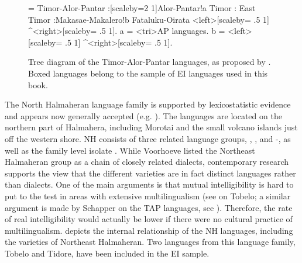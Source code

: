 \begin{figure}

\begin{footnotesize}
\jtree[xunit=5em,yunit=2em]
\! = {Timor-Alor-Pantar}
:[scaleby=2 1]{Alor-Pantar}!a {Timor}
:{} {East Timor}
:{Makasae-Makalero}!b {Fataluku-Oirata}
<left>[scaleby= .5 1]{} ^<right>[scaleby= .5 1]{}.
\!a = <tri>{AP languages}{}.
\!b = <left>[scaleby= .5 1]{} ^<right>[scaleby= .5 1]{}.
\endjtree
\end{footnotesize}

\caption[The Timor-Alor-Pantar languages]{Tree diagram of the Timor-Alor-Pantar languages, as proposed by \citet{schapper2014intro}. Boxed languages belong to the sample of EI languages used in this book.}\label{fig:timor-alor-pantar}
\end{figure}

The North Halmaheran language family is supported by lexicostatistic evidence and appears now generally accepted (e.g. \citealt{Voorhoeve1994, reesink2005west}). The languages are located on the northern part of Halmahera, including Morotai and the small volcano islands just off the western shore. NH consists of three related language groups, , , and -, as well as the family level isolate  \citep{Voorhoeve1994}. While Voor\-hoeve listed the Northeast Halmaheran group as a chain of closely related dialects, contemporary research supports the view that the different varieties are in fact distinct languages rather than dialects. One of the main arguments is that mutual intelligibility is hard to put to the test in areas with extensive multilingualism (see \citealt{holton2003tobelo} on Tobelo; a similar argument is made by Schapper on the TAP languages, see \citealt[3]{schapper2014intro}). Therefore, the rate of real intelligibility would actually be lower if there were no cultural practice of multilingualism.  depicts the internal relationship of the NH languages, including the varieties of Northeast Halmaheran. Two languages from this language family, Tobelo and Tidore, have been included in the EI sample.

